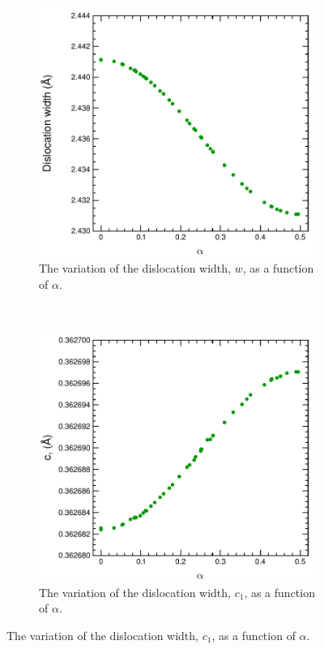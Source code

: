\begin{figure}
\centering

\begin{subfigure}{0.45\textwidth}
\centering
\includegraphics[width=\textwidth]{w_vs_alpha}
\caption{The variation of the dislocation width, $w$, as a function of $\alpha$.}
\end{subfigure}
~
\begin{subfigure}{0.45\textwidth}
\centering
\includegraphics[width=\textwidth]{c1_vs_alpha}
\caption{The variation of the dislocation width, $c_1$, as a function of $\alpha$.}
\end{subfigure}


\end{figure}
